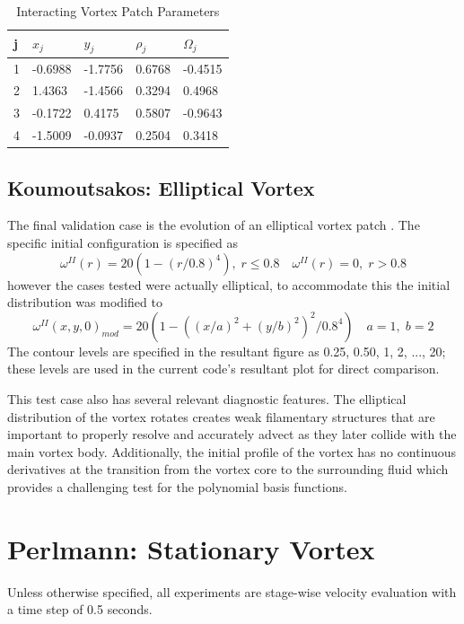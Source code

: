 \documentclass[letterpaper,12pt]{report}
\newcommand{\be}{\begin{equation}}
\newcommand{\ben}[1]{\begin{equation}\label{#1}}
\newcommand{\ee}{\end{equation}}
\begin{document}
\begin{table}
\centering
\caption{Interacting Vortex Patch Parameters}\label{table:StrainTable}
\begin{tabular}{lllll}
\hline
j & $x_j$    & $y_j$    & $\rho_j$ & $\Omega_j$ \\ \hline
1 & -0.6988 & -1.7756 & 0.6768  & -0.4515   \\
2 & 1.4363  & -1.4566 & 0.3294  & 0.4968    \\
3 & -0.1722 & 0.4175  & 0.5807  & -0.9643   \\
4 & -1.5009 & -0.0937 & 0.2504  &  0.3418    \\ \hline
\end{tabular}
\end{table}

\subsection{Koumoutsakos: Elliptical Vortex}
The final validation case is the evolution of an elliptical vortex patch \cite{Koum1997}. The specific initial configuration is specified as
\be \omega^{II}(r) = 20(1-(r/0.8)^4), \; r\leq 0.8 \quad \omega^{II}(r)=0, \; r>0.8 \ee
however the cases tested were actually elliptical, to accommodate this the initial distribution was modified to
\ben{KoumEqn} \omega^{II}(x,y,0)_{mod} = 20(1-((x/a)^2+(y/b)^2)^2/0.8^4 ) \quad a=1, \; b=2 \ee
The contour levels are specified in the resultant figure as 0.25, 0.50, 1, 2, ..., 20; these levels are used in the current code's resultant plot for direct comparison.

This test case also has several relevant diagnostic features. The elliptical distribution of the vortex rotates creates weak filamentary structures that are important to properly resolve and accurately advect as they later collide with the main vortex body. Additionally, the initial profile of the vortex has no continuous derivatives at the transition from the vortex core to the surrounding fluid which provides a challenging test for the polynomial basis functions.

\section{Perlmann: Stationary Vortex}
Unless otherwise specified, all experiments are stage-wise velocity evaluation with a time step of 0.5 seconds.
\end{document}
